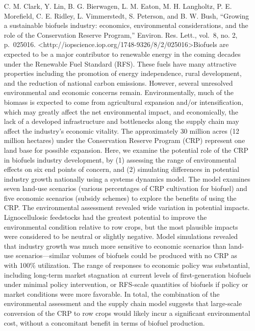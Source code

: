 \documentclass[]{article}
\begin{document}
C. M. Clark, Y. Lin, B. G. Bierwagen, L. M. Eaton, M. H. Langholtz, P.
E. Morefield, C. E. Ridley, L. Vimmerstedt, S. Peterson, and B. W. Bush,
``Growing a sustainable biofuels industry: economics, environmental
considerations, and the role of the Conservation Reserve Program,''
Environ. Res. Lett., vol.~8, no. 2, p.~025016.
\textless{}http://iopscience.iop.org/1748-9326/8/2/025016\textgreater{}Biofuels
are expected to be a major contributor to renewable energy in the coming
decades under the Renewable Fuel Standard (RFS). These fuels have many
attractive properties including the promotion of energy independence,
rural development, and the reduction of national carbon emissions.
However, several unresolved environmental and economic concerns remain.
Environmentally, much of the biomass is expected to come from
agricultural expansion and/or intensification, which may greatly affect
the net environmental impact, and economically, the lack of a developed
infrastructure and bottlenecks along the supply chain may affect the
industry's economic vitality. The approximately 30 million acres (12
million hectares) under the Conservation Reserve Program (CRP) represent
one land base for possible expansion. Here, we examine the potential
role of the CRP in biofuels industry development, by (1) assessing the
range of environmental effects on six end points of concern, and (2)
simulating differences in potential industry growth nationally using a
systems dynamics model. The model examines seven land-use scenarios
(various percentages of CRP cultivation for biofuel) and five economic
scenarios (subsidy schemes) to explore the benefits of using the CRP.
The environmental assessment revealed wide variation in potential
impacts. Lignocellulosic feedstocks had the greatest potential to
improve the environmental condition relative to row crops, but the most
plausible impacts were considered to be neutral or slightly negative.
Model simulations revealed that industry growth was much more sensitive
to economic scenarios than land-use scenarios---similar volumes of
biofuels could be produced with no CRP as with 100\% utilization. The
range of responses to economic policy was substantial, including
long-term market stagnation at current levels of first-generation
biofuels under minimal policy intervention, or RFS-scale quantities of
biofuels if policy or market conditions were more favorable. In total,
the combination of the environmental assessment and the supply chain
model suggests that large-scale conversion of the CRP to row crops would
likely incur a significant environmental cost, without a concomitant
benefit in terms of biofuel production.
\end{document}
